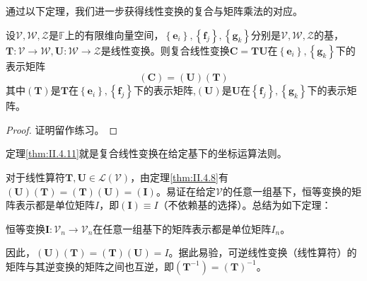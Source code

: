 \documentclass[main.tex]{subfiles}
\begin{document}
通过以下定理，我们进一步获得线性变换的复合与矩阵乘法的对应。
\begin{theorem}\label{thm:II.4.11}
设$\mathcal{V},\mathcal{W},\mathcal{Z}$是$\mathbb{F}$上的有限维向量空间，$\left\{\mathbf{e}_i\right\},\left\{\mathbf{f}_j\right\},\left\{\mathbf{g}_k\right\}$分别是$\mathcal{V},\mathcal{W},\mathcal{Z}$的基，$\mathbf{T}:\mathcal{V}\rightarrow\mathcal{W},\mathbf{U}:\mathcal{W}\rightarrow\mathcal{Z}$是线性变换。则复合线性变换$\mathbf{C}=\mathbf{TU}$在$\left\{\mathbf{e}_i\right\},\left\{\mathbf{g}_k\right\}$下的表示矩阵
\[\left(\mathbf{C}\right)=\left(\mathbf{U}\right)\left(\mathbf{T}\right)\]
其中$\left(\mathbf{T}\right)$是$\mathbf{T}$在$\left\{\mathbf{e}_i\right\},\left\{\mathbf{f}_j\right\}$下的表示矩阵,$\left(\mathbf{U}\right)$是$\mathbf{U}$在$\left\{\mathbf{f}_j\right\},\left\{\mathbf{g}_k\right\}$下的表示矩阵。
\end{theorem}
\begin{proof}
证明留作练习。
\end{proof}

定理\ref{thm:II.4.11}就是复合线性变换在给定基下的坐标运算法则。

对于线性算符$\mathbf{T},\mathbf{U}\in\mathcal{L}\left(\mathcal{V}\right)$，由定理\ref{thm:II.4.8}有$\left(\mathbf{U}\right)\left(\mathbf{T}\right)=\left(\mathbf{T}\right)\left(\mathbf{U}\right)=\left(\mathbf{I}\right)$。易证在给定$\mathcal{V}$的任意一组基下，恒等变换的矩阵表示都是单位矩阵$I$，即$\left(\mathbf{I}\right)\equiv I$（不依赖基的选择）。总结为如下定理：
\begin{theorem}
恒等变换$\mathbf{I}:\mathcal{V}_n\rightarrow\mathcal{V}_n$在任意一组基下的矩阵表示都是单位矩阵$I_n$。
\end{theorem}
因此，$\left(\mathbf{U}\right)\left(\mathbf{T}\right)=\left(\mathbf{T}\right)\left(\mathbf{U}\right)=I$。据此易验，可逆线性变换（线性算符）的矩阵与其逆变换的矩阵之间也互逆，即$\left(\mathbf{T}^{-1}\right)=\left(\mathbf{T}\right)^{-1}$。
\end{document}

